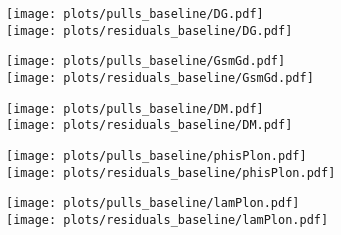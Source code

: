 \begin{subappendices}









\begin{figure}[H]
  \centering
  \begin{multicols}{2}
  \texttt{[image: plots/pulls\_baseline/DG.pdf]}  \\
  \texttt{[image: plots/residuals\_baseline/DG.pdf]}
  \end{multicols}  
  \begin{multicols}{2}
  \texttt{[image: plots/pulls\_baseline/GsmGd.pdf]}  \\
  \texttt{[image: plots/residuals\_baseline/GsmGd.pdf]}
  \end{multicols}  
  \begin{multicols}{2}
  \texttt{[image: plots/pulls\_baseline/DM.pdf]}  \\
  \texttt{[image: plots/residuals\_baseline/DM.pdf]}
  \end{multicols}  
  \begin{multicols}{2}
  \texttt{[image: plots/pulls\_baseline/phisPlon.pdf]}  \\
  \texttt{[image: plots/residuals\_baseline/phisPlon.pdf]}
  \end{multicols}  
  \begin{multicols}{2}
  \texttt{[image: plots/pulls\_baseline/lamPlon.pdf]}  \\
  \texttt{[image: plots/residuals\_baseline/lamPlon.pdf]}
  \end{multicols}    
\end{figure}


\end{subappendices}
